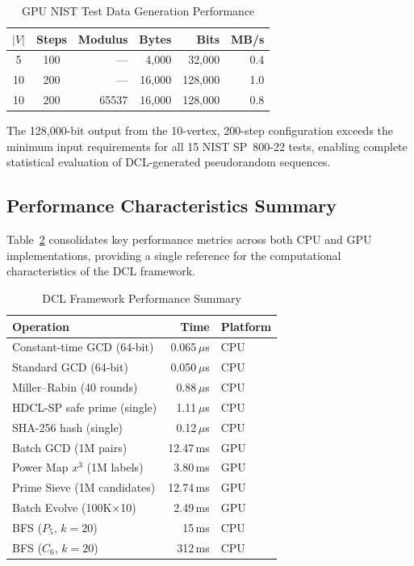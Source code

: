 \documentclass[lettersize,journal]{IEEEtran}
\begin{document}
\begin{table}[!t]
\caption{GPU NIST Test Data Generation Performance\label{tab:nistgen}}
\centering
\begin{tabular}{@{}ccrrrr@{}}
\toprule
$|V|$ & Steps & Modulus & \textbf{Bytes} & \textbf{Bits} & \textbf{MB/s} \\
\midrule
5  & 100 & --- & 4{,}000    & 32{,}000   & 0.4 \\
10 & 200 & --- & 16{,}000   & 128{,}000  & 1.0 \\
10 & 200 & 65537 & 16{,}000 & 128{,}000  & 0.8 \\
\bottomrule
\end{tabular}
\end{table}

\noindent The 128{,}000-bit output from the 10-vertex, 200-step configuration exceeds the minimum input requirements for all 15 NIST SP~800-22 tests, enabling complete statistical evaluation of DCL-generated pseudorandom sequences.

\subsection{Performance Characteristics Summary}

Table~\ref{tab:perf_summary} consolidates key performance metrics across both CPU and GPU implementations, providing a single reference for the computational characteristics of the DCL framework.

\begin{table}[!t]
\caption{DCL Framework Performance Summary\label{tab:perf_summary}}
\centering
\begin{tabular}{@{}lrl@{}}
\toprule
\textbf{Operation} & \textbf{Time} & \textbf{Platform} \\
\midrule
Constant-time GCD (64-bit)     & 0.065\,$\mu$s & CPU \\
Standard GCD (64-bit)          & 0.050\,$\mu$s & CPU \\
Miller--Rabin (40 rounds)       & 0.88\,$\mu$s  & CPU \\
HDCL-SP safe prime (single)    & 1.11\,$\mu$s  & CPU \\
SHA-256 hash (single)          & 0.12\,$\mu$s  & CPU \\
Batch GCD (1M pairs)           & 12.47\,ms     & GPU \\
Power Map $x^3$ (1M labels)    & 3.80\,ms      & GPU \\
Prime Sieve (1M candidates)    & 12.74\,ms     & GPU \\
Batch Evolve (100K$\times$10)  & 2.49\,ms      & GPU \\
BFS ($P_5$, $k{=}20$)          & 15\,ms        & CPU \\
BFS ($C_6$, $k{=}20$)          & 312\,ms       & CPU \\
\bottomrule
\end{tabular}
\end{table}
\end{document}
